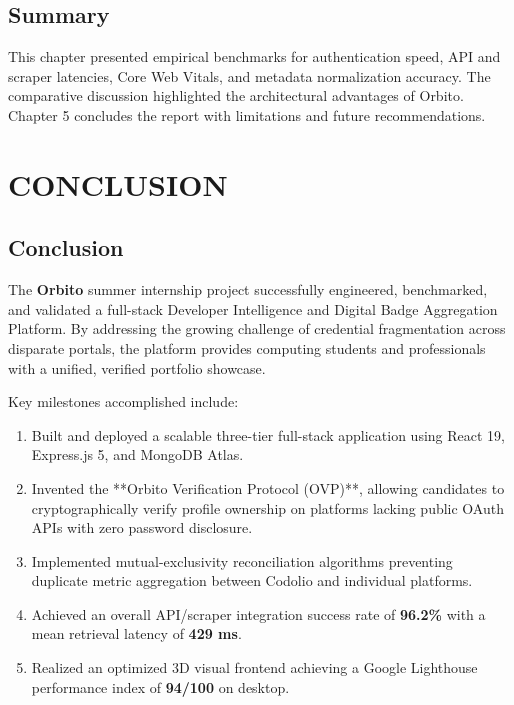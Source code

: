 \documentclass[12pt,a4paper]{article}
\begin{document}
\subsection{Summary}
This chapter presented empirical benchmarks for authentication speed, API and scraper latencies, Core Web Vitals, and metadata normalization accuracy. The comparative discussion highlighted the architectural advantages of Orbito. Chapter 5 concludes the report with limitations and future recommendations.

\newpage

\section{CONCLUSION}

\subsection{Conclusion}
The \textbf{Orbito} summer internship project successfully engineered, benchmarked, and validated a full-stack Developer Intelligence and Digital Badge Aggregation Platform. By addressing the growing challenge of credential fragmentation across disparate portals, the platform provides computing students and professionals with a unified, verified portfolio showcase.

Key milestones accomplished include:
\begin{enumerate}[leftmargin=*]
    \item Built and deployed a scalable three-tier full-stack application using React 19, Express.js 5, and MongoDB Atlas.
    \item Invented the **Orbito Verification Protocol (OVP)**, allowing candidates to cryptographically verify profile ownership on platforms lacking public OAuth APIs with zero password disclosure.
    \item Implemented mutual-exclusivity reconciliation algorithms preventing duplicate metric aggregation between Codolio and individual platforms.
    \item Achieved an overall API/scraper integration success rate of \textbf{96.2\%} with a mean retrieval latency of \textbf{429 ms}.
    \item Realized an optimized 3D visual frontend achieving a Google Lighthouse performance index of \textbf{94/100} on desktop.
\end{enumerate}
\end{document}
